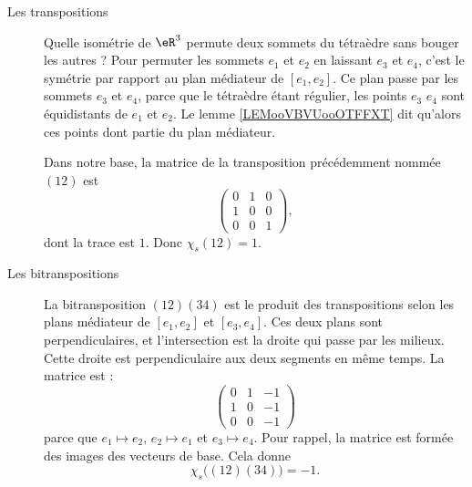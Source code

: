 \begin{description}
    \item[Les transpositions]

        Quelle isométrie de $\eR^3$ permute deux sommets du tétraèdre sans bouger les autres ? Pour permuter les sommets \( e_1\) et \( e_2\) en laissant \( e_3\) et \( e_4\), c'est le symétrie par rapport au plan médiateur de \( [e_1,e_2]\). Ce plan passe par les sommets \( e_3\) et \( e_4\), parce que le tétraèdre étant régulier, les points \( e_3\) \( e_4\) sont équidistants de \( e_1\) et \( e_2\). Le lemme \ref{LEMooVBVUooOTFFXT} dit qu'alors ces points dont partie du plan médiateur.

        Dans notre base, la matrice de la transposition précédemment nommée \( (12)\) est
        \begin{equation}
            \begin{pmatrix}
                0    &   1    &   0    \\
                1    &   0    &   0    \\
                0    &   0    &   1
            \end{pmatrix},
        \end{equation}
        dont la trace est \( 1\). Donc \( \chi_s(12)=1\).

    \item[Les bitranspositions]

        La bitransposition \( (12)(34)\) est le produit des transpositions selon les plans médiateur de \( [e_1,e_2]\) et \( [e_3,e_4]\). Ces deux plans sont perpendiculaires, et l'intersection est la droite qui passe par les milieux. Cette droite est perpendiculaire aux deux segments en même temps. La matrice est :
        \begin{equation}
            \begin{pmatrix}
                0    &    1   &   -1    \\
                1    &   0    &   -1    \\
                0    &   0    &   -1
            \end{pmatrix}
        \end{equation}
        parce que \( e_1\mapsto e_2\), \( e_2\mapsto e_1\) et \( e_3\mapsto e_4\). Pour rappel, la matrice est formée des images des vecteurs de base. Cela donne
        \begin{equation}
            \chi_s\big( (12)(34) \big)=-1.
        \end{equation}


\end{description}
